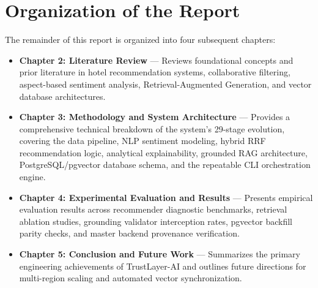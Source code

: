 \section{Organization of the Report}
The remainder of this report is organized into four subsequent chapters:
\begin{itemize}
    \item \textbf{Chapter 2: Literature Review} — Reviews foundational concepts and prior literature in hotel recommendation systems, collaborative filtering, aspect-based sentiment analysis, Retrieval-Augmented Generation, and vector database architectures.
    \item \textbf{Chapter 3: Methodology and System Architecture} — Provides a comprehensive technical breakdown of the system's 29-stage evolution, covering the data pipeline, NLP sentiment modeling, hybrid RRF recommendation logic, analytical explainability, grounded RAG architecture, PostgreSQL/pgvector database schema, and the repeatable CLI orchestration engine.
    \item \textbf{Chapter 4: Experimental Evaluation and Results} — Presents empirical evaluation results across recommender diagnostic benchmarks, retrieval ablation studies, grounding validator interception rates, pgvector backfill parity checks, and master backend provenance verification.
    \item \textbf{Chapter 5: Conclusion and Future Work} — Summarizes the primary engineering achievements of TrustLayer-AI and outlines future directions for multi-region scaling and automated vector synchronization.
\end{itemize}